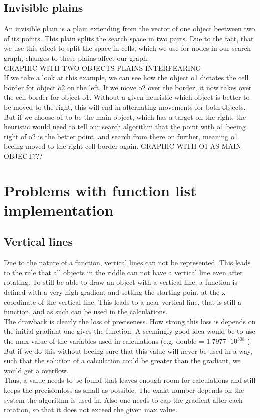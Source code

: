 \subsection{Invisible plains}
An invisible plain is a plain extending from the vector of one object beetween two of its points. This plain splits the search space in two parts. Due to the fact, that we use this effect to split the space in cells, which we use for nodes in our search graph, changes to these plains affect our graph.\\
GRAPHIC WITH TWO OBJECTS PLAINS INTERFEARING\\
If we take a look at this example, we can see how the object o1 dictates the cell border for object o2 on the left. If we move o2 over the border, it now takes over the cell border for object o1. Without a given heuristic which object is better to be moved to the right, this will end in alternating movements for both objects.\\
But if we choose o1 to be the main object, which has a target on the right, the heuristic would need to tell our search algorithm that the point with o1 beeing right of o2 is the better point, and search from there on further, meaning o1 beeing moved to the right cell border again.
GRAPHIC WITH O1 AS MAIN OBJECT???

\section{Problems with function list implementation}
\subsection{Vertical lines}
Due to the nature of a function, vertical lines can not be represented. This leads to the rule that all objects in the riddle can not have a vertical line even after rotating. 
To still be able to draw an object with a vertical line, a function is defined with a very high gradient and setting the starting point at the x-coordinate of the vertical line. This leads to a near vertical line, that is still a function, and as such can be used in the calculations.\\
The drawback is clearly the loss of preciseness. How strong this loss is depends on the initial gradiant one gives the function. A seemingly good idea would be to use the max value of the variables used in calculations (e.g. double = $1.7977 \cdot 10^308$ ). But if we do this without beeing sure that this value will never be used in a way, such that the solution of a calculation could be greater than the gradiant, we would get a overflow.\\
Thus, a value needs to be found that leaves enough room for calculations and still keeps the precisionloss as small as possible. The exakt number depends on the system the algorithm is used in. Also one needs to cap the gradient after each rotation, so that it does not exceed the given max value.


